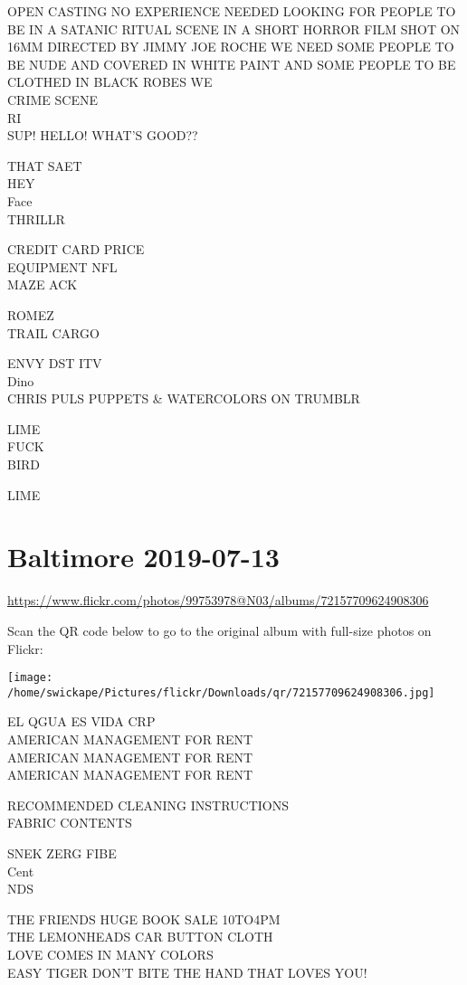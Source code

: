 \documentclass[10pt,letterpaper]{article}
\begin{document}
OPEN CASTING NO EXPERIENCE NEEDED LOOKING FOR PEOPLE TO BE IN A SATANIC RITUAL SCENE IN A SHORT HORROR FILM SHOT ON 16MM DIRECTED BY JIMMY JOE ROCHE WE NEED SOME PEOPLE TO BE NUDE AND COVERED IN WHITE PAINT AND SOME PEOPLE TO BE CLOTHED IN BLACK ROBES WE\\
CRIME SCENE\\
RI\\
SUP! HELLO!  WHAT'S GOOD??

THAT SAET\\
HEY\\
Face\\
THRILLR

CREDIT CARD PRICE\\
EQUIPMENT NFL\\
MAZE ACK

ROMEZ\\
TRAIL CARGO

ENVY DST ITV\\
Dino\\
CHRIS PULS PUPPETS \& WATERCOLORS ON TRUMBLR

LIME\\
FUCK\\
BIRD

LIME
\pagebreak

\section*{Baltimore 2019-07-13}

\url{https://www.flickr.com/photos/99753978@N03/albums/72157709624908306}

Scan the QR code below to go to the original album with full-size photos on Flickr:

\texttt{[image: /home/swickape/Pictures/flickr/Downloads/qr/72157709624908306.jpg]}
\pagebreak

EL QGUA ES VIDA CRP\\
AMERICAN MANAGEMENT FOR RENT\\
AMERICAN MANAGEMENT FOR RENT\\
AMERICAN MANAGEMENT FOR RENT

RECOMMENDED CLEANING INSTRUCTIONS\\
FABRIC CONTENTS

SNEK ZERG FIBE\\
Cent\\
NDS

THE FRIENDS HUGE BOOK SALE 10TO4PM\\
THE LEMONHEADS CAR BUTTON CLOTH\\
LOVE COMES IN MANY COLORS\\
EASY TIGER DON'T BITE THE HAND THAT LOVES YOU!
\end{document}
